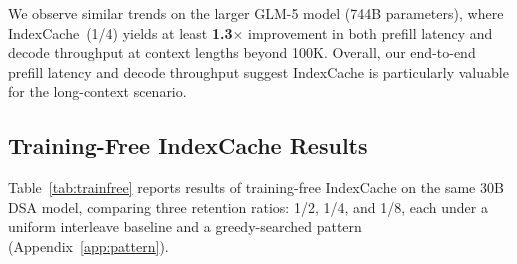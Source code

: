 We observe similar trends on the larger GLM-5 model (744B parameters), where IndexCache~(1/4) yields at least \textbf{1.3$\times$} improvement in both prefill latency and decode throughput at context lengths beyond 100K.
Overall, our end-to-end prefill latency and decode throughput suggest IndexCache is particularly valuable for the long-context scenario.


\subsection{Training-Free IndexCache Results}
\label{sec:exp-trainfree}

Table~\ref{tab:trainfree} reports results of training-free IndexCache on the same 30B DSA model, comparing three retention ratios: 1/2, 1/4, and 1/8, each under a uniform interleave baseline and a greedy-searched pattern (Appendix~\ref{app:pattern}).

\begin{table}[t]
\centering
\caption{%
Training-free IndexCache at 1/2, 1/4, and 1/8 indexer retention.
`Long' and `G\&R' aggregate benchmark scores.
We compare uniform interleaving against searched patterns.
}
\label{tab:trainfree}
{}
\end{table}

